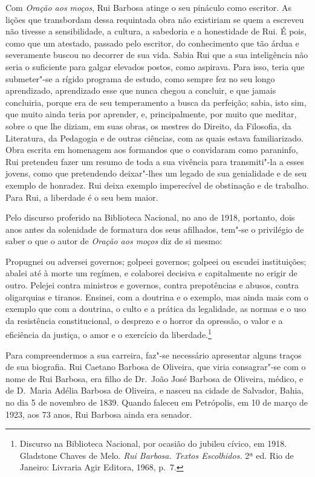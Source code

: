 Com \textit{Oração aos moços}, Rui Barbosa atinge o seu pináculo como escritor.
As lições que transbordam dessa requintada obra não existiriam se quem
a escreveu não tivesse a sensibilidade, a cultura, a sabedoria e a
honestidade de Rui. É pois, como que um atestado,
passado pelo escritor, do conhecimento que tão árdua e severamente
buscou no decorrer de sua vida. Sabia Rui que a sua inteligência não
seria o suficiente para galgar elevados postos, como aspirava. Para
isso, teria que submeter"-se a rígido programa de estudo, como sempre
fez no seu longo aprendizado, aprendizado esse que nunca chegou a
concluir, e que jamais concluiria, porque era de seu temperamento a
busca da perfeição; sabia, isto sim, que muito ainda teria por
aprender, e, principalmente, por muito que meditar, sobre o que lhe
diziam, em suas obras, os mestres do Direito, da Filosofia, da
Literatura, da Pedagogia e de outras ciências, com as quais estava
familiarizado. Obra escrita em homenagem aos
formandos que o convidaram como paraninfo, Rui pretendeu fazer um
resumo de toda a sua vivência para transmiti"-la a esses jovens, como
que pretendendo deixar"-lhes um legado de sua genialidade e de seu
exemplo de honradez. Rui deixa exemplo imperecível de obstinação e de
trabalho. Para Rui, a liberdade é o seu bem maior. 

Pelo discurso proferido na Biblioteca Nacional, no ano de 1918,
portanto, dois anos antes da solenidade de formatura dos seus
afilhados, tem"-se o privilégio de saber o que o autor de \textit{Oração aos
moços} diz de si mesmo: 

\begin{hedraquote}
Propugnei ou adversei governos; golpeei
governos; golpeei ou escudei instituições; abalei até à morte um
regímen, e colaborei decisiva e capitalmente no erigir de outro.
Pelejei contra ministros e governos, contra prepotências e abusos,
contra oligarquias e tiranos. Ensinei, com a doutrina e o exemplo, mas
ainda mais com o exemplo que com a doutrina, o culto e a prática da
legalidade, as normas e o uso da resistência constitucional, o desprezo
e o horror da opressão, o valor e a eficiência da justiça, o amor e o
exercício da liberdade.\footnote{ Discurso na Biblioteca Nacional, por ocasião
do jubileu cívico, em 1918.  Gladstone Chaves de Melo. \textit{Rui 
Barbosa. Textos Escolhidos.} 2ª ed. Rio de Janeiro: Livraria Agir Editora, 
1968, p.~7.}
\end{hedraquote}


Para compreendermos a sua carreira, faz"-se necessário apresentar alguns traços
de sua biografia.  Rui Caetano Barbosa de Oliveira, que viria
consagrar"-se com o nome de Rui Barbosa, era filho de Dr.~João José
Barbosa de Oliveira, médico, e de D.~Maria Adélia Barbosa de Oliveira, e nasceu 
na cidade de Salvador, Bahia, no dia 5 de novembro de 1839. Quando faleceu em 
Petrópolis, em 10 de março de 1923, aos 73 anos, Rui Barbosa ainda era senador. 

